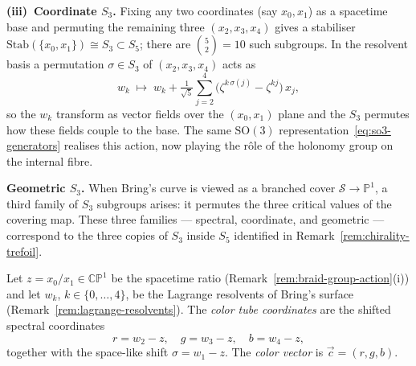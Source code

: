 \begin{remark}
\medskip
\noindent\textbf{(iii)~Coordinate $S_3$.}\;
Fixing any two coordinates (say $x_0,x_1$) as a spacetime base and
permuting the remaining three $(x_2,x_3,x_4)$ gives a stabiliser
$\mathrm{Stab}(\{x_0,x_1\})\cong S_3\subset S_5$; there are
$\binom{5}{2}=10$ such subgroups.  In the resolvent basis a
permutation $\sigma\in S_3$ of $(x_2,x_3,x_4)$ acts as
\begin{equation}\label{eq:coord-s3-shift}
  w_k\;\longmapsto\;
  w_k+\tfrac{1}{\sqrt{5}}\sum_{j=2}^{4}
    \bigl(\zeta^{k\,\sigma(j)}-\zeta^{kj}\bigr)\,x_j,
\end{equation}
so the $w_k$ transform as vector fields over the $(x_0,x_1)$ plane and
the $S_3$ permutes how these fields couple to the base.  The same
$\mathrm{SO}(3)$ representation~\eqref{eq:so3-generators} realises this
action, now playing the r\^ole of the holonomy group on the internal
fibre.

\medskip
\noindent\textbf{Geometric $S_3$.}\;
When Bring's curve is viewed as a branched cover
$\mathcal{S}\to\mathbb{P}^1$, a third family of $S_3$ subgroups arises:
it permutes the three critical values of the covering map.  These three
families --- spectral, coordinate, and geometric --- correspond to the
three copies of $S_3$ inside $S_5$ identified in
Remark~\ref{rem:chirality-trefoil}.
\end{remark}

\begin{definition}
\label{def:color-tube-coordinates}
  Let $z = x_0/x_1 \in \mathbb{CP}^1$ be the spacetime ratio
  (Remark~\ref{rem:braid-group-action}\textup{(i)}) and let $w_k$,
  $k \in \{0,\dots,4\}$, be the Lagrange resolvents of Bring's surface
  (Remark~\ref{rem:lagrange-resolvents}).  The \emph{color tube coordinates}
  are the shifted spectral coordinates
  \begin{equation}\label{eq:color-tube-coords}
    r = w_2 - z, \quad g = w_3 - z, \quad b = w_4 - z,
  \end{equation}
  together with the space-like shift $\sigma = w_1 - z$.  The
  \emph{color vector} is $\vec{c} = (r, g, b)$.
\end{definition}

